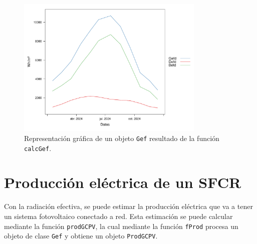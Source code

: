\begin{figure}[!htb]
\centering
\includegraphics[width=0.8\textwidth]{figuras/codigo-gef.pdf}
\caption{Representación gráfica de un objeto \texttt{Gef} resultado de la función \texttt{calcGef}.}
\end{figure}
\FloatBarrier
\section{Producción eléctrica de un SFCR}
\label{sec:org6dbfbb7}
\label{produccion-electrica-sfcr}
Con la radiación efectiva, se puede estimar la producción eléctrica que va a tener un sistema fotovoltaico conectado a red. Esta estimación se puede calcular mediante la función \texttt{prodGCPV}, la cual mediante la función \texttt{fProd} procesa un objeto de clase \texttt{Gef} y obtiene un objeto \texttt{ProdGCPV}.

